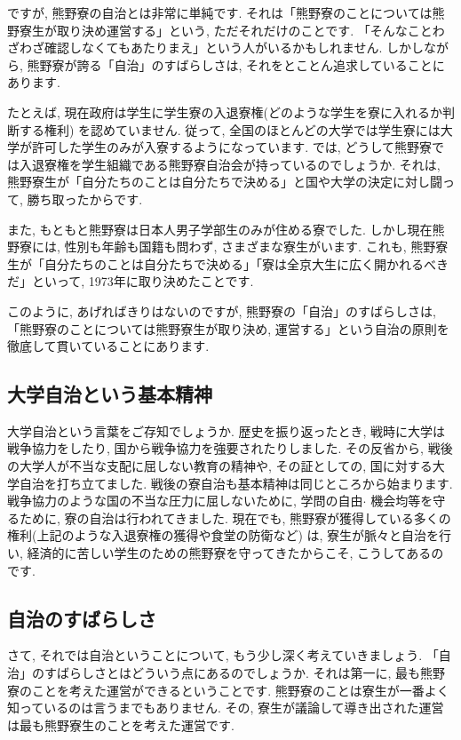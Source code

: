 \documentclass[10pt,b5jsbook,dvips,dvipdfmx,openany]{jsbook}
\theoremstyle{definition}
\begin{document}
	ですが, 熊野寮の自治とは非常に単純です. それは「熊野寮のことについては熊野寮生が取り決め運営する」という, ただそれだけのことです. 
    「そんなことわざわざ確認しなくてもあたりまえ」という人がいるかもしれません. しかしながら, 熊野寮が誇る「自治」のすばらしさは, それをとことん追求していることにあります. 

	たとえば, 現在政府は学生に学生寮の入退寮権(どのような学生を寮に入れるか判断する権利) を認めていません. 従って, 全国のほとんどの大学では学生寮には大学が許可した学生のみが入寮するようになっています. では, どうして熊野寮では入退寮権を学生組織である熊野寮自治会が持っているのでしょうか. それは, 熊野寮生が「自分たちのことは自分たちで決める」と国や大学の決定に対し闘って, 勝ち取ったからです. 

	また, もともと熊野寮は日本人男子学部生のみが住める寮でした. しかし現在熊野寮には, 性別も年齢も国籍も問わず, さまざまな寮生がいます. これも, 熊野寮生が「自分たちのことは自分たちで決める」「寮は全京大生に広く開かれるべきだ」といって, 1973年に取り決めたことです. 

	このように, あげればきりはないのですが, 熊野寮の「自治」のすばらしさは, 「熊野寮のことについては熊野寮生が取り決め, 運営する」という自治の原則を徹底して貫いていることにあります. 

		\subsection{大学自治という基本精神}

		大学自治という言葉をご存知でしょうか. 歴史を振り返ったとき, 戦時に大学は戦争協力をしたり, 国から戦争協力を強要されたりしました. その反省から, 戦後の大学人が不当な支配に屈しない教育の精神や, その証としての, 国に対する大学自治を打ち立てました. 戦後の寮自治も基本精神は同じところから始まります. 戦争協力のような国の不当な圧力に屈しないために, 学問の自由$ \cdot $ 機会均等を守るために, 寮の自治は行われてきました. 現在でも, 熊野寮が獲得している多くの権利(上記のような入退寮権の獲得や食堂の防衛など) は, 寮生が脈々と自治を行い, 経済的に苦しい学生のための熊野寮を守ってきたからこそ, こうしてあるのです. 

		\subsection{自治のすばらしさ}

		さて, それでは自治ということについて, もう少し深く考えていきましょう. 「自治」のすばらしさとはどういう点にあるのでしょうか. それは第一に, 最も熊野寮のことを考えた運営ができるということです. 熊野寮のことは寮生が一番よく知っているのは言うまでもありません. その, 寮生が議論して導き出された運営は最も熊野寮生のことを考えた運営です. 
\end{document}
